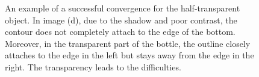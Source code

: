 \begin{figure}[htbp]
\begin{minipage}[t]{0.5\linewidth}
  \end{minipage} 
  \begin{minipage}[t]{0.5\linewidth} 
    \centering 
  \end{minipage} 
\caption[An example of a successful convergence for the half-transparent object]{An example of a
  successful convergence for the half-transparent object. In image (d), due to the shadow and poor
contrast, the contour does not completely attach to the edge of the
bottom. Moreover, in the transparent part of the bottle, the outline
closely attaches to the edge in the left but stays away from the edge
in the right. The transparency leads to the difficulties. }
\label{fig:cola}
\end{figure}

